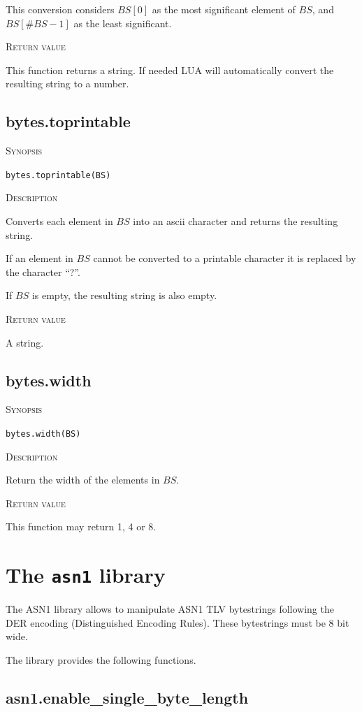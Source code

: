 \documentclass[11pt]{report}
\newcommand{\mansection}[1]{\vspace{0.5em}\par\noindent\textsc{#1}\vspace{0.5em}\par}
\begin{document}
  This conversion considers $BS[0]$ as the most significant element of $BS$, 
  and $BS[\#BS-1]$ as the least significant. 
  
\mansection{Return value}
  This function returns a string.
  If needed LUA will automatically convert the resulting string to a number.


\subsection{bytes.toprintable}

\mansection{Synopsis}
\texttt{bytes.toprintable(BS)}

\mansection{Description}
  Converts each element in $BS$ into an ascii character and returns the
  resulting string.

  If an element in $BS$ cannot be converted to a printable character it
  is replaced by the character ``?''. 

  If $BS$ is empty, the resulting string is also empty.

\mansection{Return value}
  A string.


\subsection{bytes.width}

\mansection{Synopsis}
\texttt{bytes.width(BS)}

\mansection{Description}
  Return the width of the elements in $BS$.

\mansection{Return value}
  This function may return 1, 4 or 8.


\section{The \texttt{asn1} library}

The ASN1 library allows to manipulate ASN1 TLV bytestrings following the DER 
encoding (Distinguished Encoding Rules).
These bytestrings must be 8 bit wide.

The library provides the following functions.


\subsection{asn1.enable\_single\_byte\_length}
\end{document}

